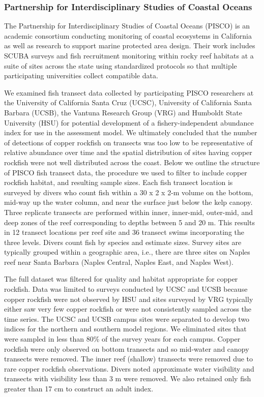 \documentclass[11pt,
  english,
  letterpaper,
]{article}
\begin{document}
\hypertarget{partnership-for-interdisciplinary-studies-of-coastal-oceans}{%
\subsubsection{Partnership for Interdisciplinary Studies of Coastal Oceans}\label{partnership-for-interdisciplinary-studies-of-coastal-oceans}}

The Partnership for Interdisciplinary Studies of Coastal Oceans (PISCO) is an academic consortium conducting monitoring of coastal ecosystems in California as well as research to support marine protected area design. Their work includes SCUBA surveys and fish recruitment monitoring within rocky reef habitats at a suite of sites across the state using standardized protocols so that multiple participating universities collect compatible data.

We examined fish transect data collected by participating PISCO researchers at the University of California Santa Cruz (UCSC), University of California Santa Barbara (UCSB), the Vantuna Research Group (VRG) and Humboldt State University (HSU) for potential development of a fishery-independent abundance index for use in the assessment model. We ultimately concluded that the number of detections of copper rockfish on transects was too low to be representative of relative abundance over time and the spatial distribution of sites having copper rockfish were not well distributed across the coast. Below we outline the structure of PISCO fish transect data, the procedure we used to filter to include copper rockfish habitat, and resulting sample sizes. Each fish transect location is surveyed by divers who count fish within a 30 x 2 x 2-m volume on the bottom, mid-way up the water column, and near the surface just below the kelp canopy. Three replicate transects are performed within inner, inner-mid, outer-mid, and deep zones of the reef corresponding to depths between 5 and 20 m. This results in 12 transect locations per reef site and 36 transect swims incorporating the three levels. Divers count fish by species and estimate sizes. Survey sites are typically grouped within a geographic area, i.e., there are three sites on Naples reef near Santa Barbara (Naples Central, Naples East, and Naples West).

The full dataset was filtered for quality and habitat appropriate for copper rockfish. Data was limited to surveys conducted by UCSC and UCSB because copper rockfish were not observed by HSU and sites surveyed by VRG typically either saw very few copper rockfish or were not consistently sampled across the time series. The UCSC and UCSB campus sites were separated to develop two indices for the northern and southern model regions. We eliminated sites that were sampled in less than 80\% of the survey years for each campus. Copper rockfish were only observed on bottom transects and so mid-water and canopy transects were removed. The inner reef (shallow) transects were removed due to rare copper rockfish observations. Divers noted approximate water visibility and transects with visibility less than 3 m were removed. We also retained only fish greater than 17 cm to construct an adult index.
\end{document}
